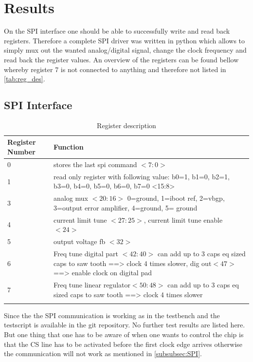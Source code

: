 \section{Results}
On the SPI interface one should be able to successfully write and read back registers. Therefore a complete SPI driver was written in python which allows to simply mux out the wanted analog/digital signal, change the clock frequency and read back the register values. An overview of the registers can be found bellow whereby register 7 is not connected to anything and therefore not listed in \autoref{tab:reg_des}.
\subsection{SPI Interface}
\begin{longtable}{|p{3.5cm}|p{10.5cm}|}
	\hline
	\rowcolor{lightgray}
	\textbf{Register Number} &\textbf{Function} \\ \hline
	0 & stores the last spi command $<7:0>$\\ \hline
    1 & read only register with following value: b0=1, b1=0, b2=1, b3=0, b4=0, b5=0, b6=0, b7=0 <15:8> \\ \hline
    3 & analog mux $<20:16>$ 0=ground, 1=iboot ref, 2=vbgp, 3=output error amplifier, 4=ground,  5= ground \\ \hline
	4 & current limit tune $<27:25>$, current limit tune enable $<24>$ \\ \hline
	5 & output voltage fb $<32>$ \\ \hline
	6 & Freq tune digital part $<42:40>$ can add up to 3 caps eq sized caps to saw tooth ==> clock 4 times slower, dig out$<47>$ ==> enable clock on digital pad\\ \hline
    7 & Freq tune linear regulator$<50:48>$ can add up to 3 caps eq sized caps to saw tooth ==> clock 4 times slower \\ \hline
	\caption{Register description} %
	\label{tab:reg_des}
\end{longtable}
Since the the SPI communication is working as in the testbench and the testscript is available in the git repository. No further test results are listed here. But one thing that one has to be aware of when one wants to control the chip is that the CS line has to be activated before the first clock edge arrives otherwise the communication will not work as mentioned in \autoref{subsubsec:SPI}.

